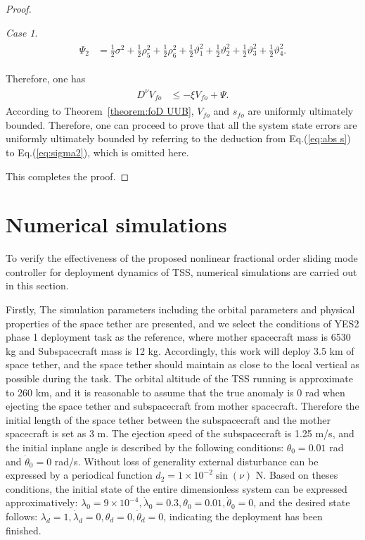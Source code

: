 \documentclass[ShortAfour]{sage}
\theoremstyle{plain}
\theoremstyle{remark}
\newtheorem{mycase1}{Case}
\begin{document}
\begin{proof}
\begin{mycase1}
\begin{align}
\begin{split}
      \Psi_2&=\frac{1}{2}\sigma^2+\frac{1}{2}\rho_5^2+\frac{1}{2}\rho_6^2+\frac{1}{2}\vartheta_1^2+\frac{1}{2}\vartheta_2^2+\frac{1}{2}\vartheta_3^2+\frac{1}{2}\vartheta_4^2.
    \end{split}\end{align}
  \end{mycase1}
  Therefore, one has
  \begin{align}\begin{split}
    D^\nu V_{fo}&\le-\xi V_{fo}+\Psi.
  \end{split}\end{align}
  According to Theorem~\ref{theorem:foD UUB}, $V_{fo}$ and $s_{fo}$ are uniformly ultimately bounded. Therefore, one can proceed to prove that all the system state errors are uniformly ultimately bounded by referring to the deduction from Eq.(\ref{eq:abs s}) to Eq.(\ref{eq:sigma2}), which is omitted here. 
  
  This completes the proof.
\end{proof}

\section{Numerical simulations}\label{sec:numerical simulation}
To verify the effectiveness of the proposed nonlinear fractional order sliding mode controller for deployment dynamics of TSS, numerical simulations are carried out in this section.

Firstly, The simulation parameters including the orbital parameters and physical properties of the space tether are presented, and we select the conditions of YES2 phase 1 deployment task as the reference, where mother spacecraft mass is 6530 {kg} and Subspacecraft mass is 12 {kg}. Accordingly, this work will deploy 3.5 {km} of space tether, and the space tether should maintain as close to the local vertical as possible during the task. The orbital altitude of the TSS running is approximate to 260 {km}, and it is reasonable to assume that the true anomaly is 0 {rad} when ejecting the space tether and subspacecraft from mother spacecraft. Therefore the initial length of the space tether between the subspacecraft and the mother spacecraft is set as 3 {m}. The ejection speed of the subspacecraft is 1.25 {m/s}, and the initial inplane angle is described by the following conditions: $\theta_0=0.01$ {rad} and $\dot\theta_0 = 0$ {rad/s}. Without loss of generality external disturbance can be expressed by a periodical function $d_2=1\times 10^{-2}\sin(\nu)$ N. Based on theses conditions, the initial state of the entire dimensionless system can be expressed approximatively: $\lambda_0 =9\times 10^{-4},\dot\lambda_0=0.3,\theta_0 = 0.01,\dot\theta_0=0$, and the desired state follows: $\lambda_d =1,\dot\lambda_d=0,\theta_d = 0,\dot\theta_d=0$, indicating the deployment  has been finished. 
\end{document}

